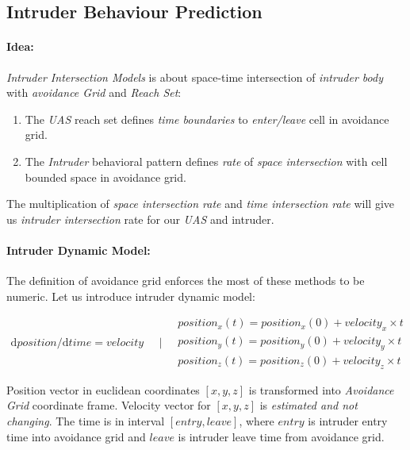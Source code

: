 \newpage
\subsection{Intruder Behaviour Prediction}\label{s:intruderBehaviourPrediction}
\paragraph{Idea:} \emph{Intruder Intersection Models} is about space-time intersection of \emph{intruder body} with \emph{avoidance Grid} and \emph{Reach Set}:
\begin{enumerate}
    \item The \emph{UAS} reach set defines \emph{time boundaries} to \emph{enter/leave} cell in avoidance grid.
    \item The \emph{Intruder} behavioral pattern defines \emph{rate} of \emph{space intersection} with cell bounded space in avoidance grid.
\end{enumerate}

The multiplication of \emph{space intersection rate} and \emph{time intersection rate} will give us \emph{intruder intersection} rate for our \emph{UAS} and intruder.


\paragraph{Intruder Dynamic Model:} The  definition of avoidance grid enforces the  most of these methods to be numeric. Let us introduce intruder dynamic model:

\begin{equation}\label{eq:intruderBasicLinearModel}
    \begin{aligned}
        \text{d} position /\text{d} time = velocity 
    \end{aligned}
    \quad | \quad
    \begin{aligned}
        position_x(t) = position_x(0) + velocity_x \times t\\
        position_y(t) = position_y(0) + velocity_y \times t\\
        position_z(t) = position_z(0) + velocity_z \times t
    \end{aligned}
\end{equation}

\noindent Position vector in euclidean coordinates $[x,y,z]$   is transformed into \emph{Avoidance Grid} coordinate frame. Velocity vector for $[x,y,z]$  is \emph{estimated and not changing}. The time  is in interval $[entry,leave]$, where $entry$ is intruder entry time into avoidance grid and $leave$ is intruder leave time from avoidance grid. 

